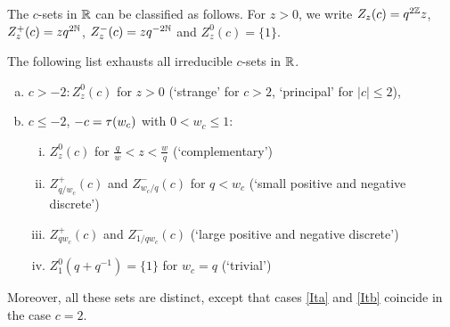 The $c$-sets in $\mathbb{R}$ can be classified as follows. For $z>0$, we write $Z_z(c) = q^{2\mathbb{Z}}z$, $Z_z^+(c) = zq^{2\mathbb{N}}$, $Z_{z}^{-}(c) = zq^{-2\mathbb{N}}$ and $Z_z^{0}(c) = \{1\}$.

\begin{Prop}\label{PropClass1D} The following list exhausts all
  irreducible $c$-sets in $\mathbb{R}$.
\begin{enumerate}[a)] 
\item $c>-2: Z_z^0(c)$ for $z>0$ (`strange' for $c>2$, `principal' for $|c|\leq 2$),
\item $c \leq -2$, $-c=\operatorname{\tau}(w_c)$ with $0 < w_c\leq 1$:
\begin{enumerate}[(i)]
\item $Z_z^0(c)$ for $\frac{q}{w}<z<\frac{w}{q}$ (`complementary')
\item\label{Ita} $Z_{q/w_c}^+(c)$ and $Z_{w_c/q}^-(c)$ for $q<w_c$ (`small positive and negative discrete')
\item\label{Itb} $Z_{qw_c}^+(c)$ and $Z_{1/qw_c}^-(c)$ (`large positive and negative discrete')
\item $Z_1^0(q+q^{-1})=\{1\}$ for $w_c=q$ (`trivial')
\end{enumerate}
\end{enumerate}
Moreover, all these sets are distinct, except that cases \eqref{Ita} and \eqref{Itb} coincide in the case $c=2$.
\end{Prop} 

